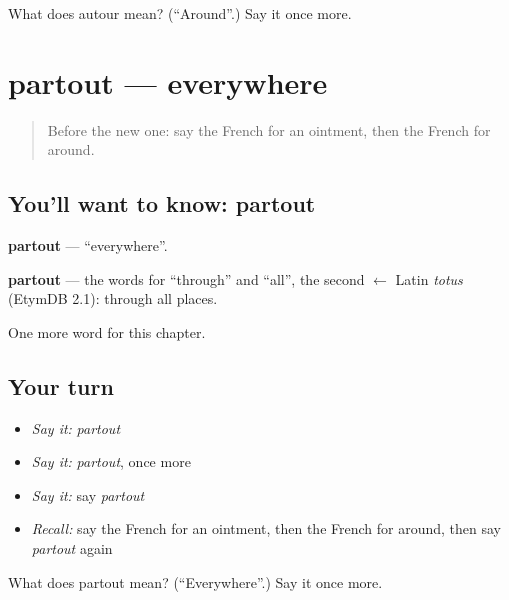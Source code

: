 \begin{tcolorbox}[breakable,colback=teal!4,colframe=teal!35!black,title={Before you move on}]
What does autour mean? (\textquotedblleft{}Around\textquotedblright{}.) Say it once more.
\end{tcolorbox}
\section[partout]{partout — everywhere}

\label{lesson:FR-C216-partout}



\begin{quote}
Before the new one: say the French for an ointment, then the French for around.
\end{quote}

\subsection*{You'll want to know: partout}
\textbf{partout} — \textquotedblleft{}everywhere\textquotedblright{}.

\begin{cousinweb}
\textbf{partout} — the words for \textquotedblleft{}through\textquotedblright{} and \textquotedblleft{}all\textquotedblright{}, the second $\leftarrow$ Latin \emph{totus} (EtymDB 2.1): through all places.
\end{cousinweb}

\begin{grammarlens}[title={What you've built}]
One more word for this chapter.
\end{grammarlens}

\subsection*{Your turn}
\begin{itemize}
\raggedright
  \item \emph{Say it:} \emph{partout}
  \item \emph{Say it:} \emph{partout}, once more
  \item \emph{Say it:} say \emph{partout}
  \item \emph{Recall:} say the French for an ointment, then the French for around, then say \emph{partout} again
\end{itemize}

\begin{tcolorbox}[breakable,colback=teal!4,colframe=teal!35!black,title={Before you move on}]
What does partout mean? (\textquotedblleft{}Everywhere\textquotedblright{}.) Say it once more.
\end{tcolorbox}
